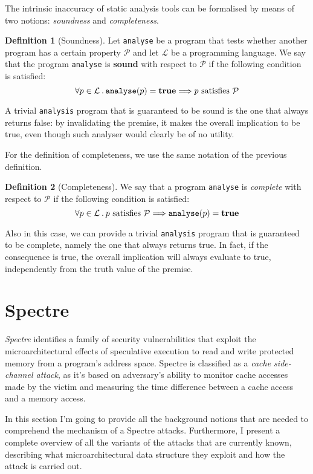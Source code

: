 \documentclass[12pt,a4paper]{book}
\newcommand{\st}{\hspace{2px}.\hspace{2px}}
\theoremstyle{definition}
\newtheorem{defn}{Definition}
\begin{document}
	The intrinsic inaccuracy of static analysis tools can be formalised by means of two notions: \textit{soundness} and \textit{completeness}.
	
	\begin{defn}[Soundness]
		Let \texttt{analyse} be a program that tests whether another program has a certain property $\mathcal{P}$ and let $\mathcal{L}$ be a programming language. We say that the program \texttt{analyse} is \textbf{sound} with respect to $\mathcal{P}$ if the following condition is satisfied:
		\[
			\forall p \in \mathcal{L} \st \text{\texttt{analyse}}(p) = \text{\textbf{true}} \Longrightarrow p \text{ satisfies } \mathcal{P}
		\]
	\end{defn}
	A trivial \texttt{analysis} program that is guaranteed to be sound is the one that always returns false: by invalidating the premise, it makes the overall implication to be true, even though such analyser would clearly be of no utility.
	
	For the definition of completeness, we use the same notation of the previous definition.
	\begin{defn}[Completeness]
		We say that a program \texttt{analyse} is \textit{complete} with respect to $\mathcal{P}$ if the following condition is satisfied:
		\[
			\forall p \in \mathcal{L} \st p \text{ satisfies } \mathcal{P} \Longrightarrow \text{\texttt{analyse}}(p) = \text{\textbf{true}} 
		\]
	\end{defn}
	Also in this case, we can provide a trivial \texttt{analysis} program that is guaranteed to be complete, namely the one that always returns true. In fact, if the consequence is true, the overall implication will always evaluate to true, independently from the truth value of the premise.
	\chapter{Spectre}
	\textit{Spectre} identifies a family of security vulnerabilities that exploit the microarchitectural effects of speculative execution to read and write protected memory from a program's address space. Spectre is classified as a \textit{cache side-channel attack}, as it's based on adversary's ability to monitor cache accesses made by the victim and measuring the time difference between a cache access and a memory access.
	
	In this section I'm going to provide all the background notions that are needed to comprehend the mechanism of a Spectre attacks. Furthermore, I present a complete overview of all the variants of the attacks that are currently known, describing what microarchitectural data structure they exploit and how the attack is carried out.
\end{document}
